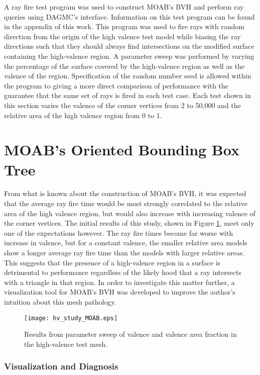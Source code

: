 A ray fire test program was used to construct MOAB's BVH and perform ray queries
using DAGMC's interface. Information on this test program can be found in the
appendix of this work. This program was used to fire rays with random direction
from the origin of the high valence test model while biasing the ray directions
such that they should always find intersections on the modified surface
containing the high-valence region. A parameter sweep was performed by varying
the percentage of the surface covered by the high-valence region as well as the
valence of the region. Specification of the random number seed is allowed within
the program to giving a more direct comparison of performance with the guarantee
that the same set of rays is fired in each test case. Each test shown in this
section varies the valence of the corner vertices from 2 to 50,000 and the
relative area of the high valence region from 0 to 1.

\section{MOAB's Oriented Bounding Box Tree}\label{sec:hv_study_MOAB}

From what is known about the construction of MOAB's BVH, it was expected that
the average ray fire time would be most strongly correlated to the relative area
of the high valence region, but would also increase with increasing valence of
the corner vertices. The initial results of this study, shown in Figure
\ref{fig:hv_study_moab}, meet only one of the expectations however. The ray fire
times become far worse with increase in valence, but for a constant valence, the
smaller relative area models show a longer average ray fire time than the models
with larger relative areas. This suggests that the presence of a high-valence
region in a surface is detrimental to performance regardless of the likely hood
that a ray intersects with a triangle in that region. In order to investigate
this matter further, a visualization tool for MOAB's BVH was developed to
improve the author's intuition about this mesh pathology.

\begin{figure}[H]
  \centering
    \texttt{[image: hv\_study\_MOAB.eps]}
    \caption{Results from parameter sweep of valence and valence area fraction
      in the high-valence test mesh.}
    \label{fig:hv_study_moab}
\end{figure}


\subsubsection{Visualization and Diagnosis}\label{subsec:hv_vis}

